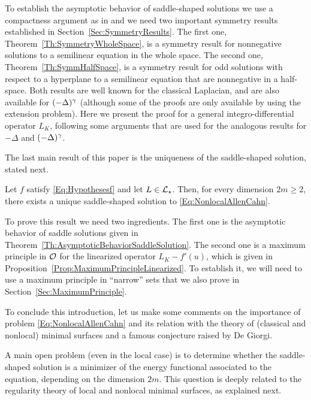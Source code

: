 To establish the asymptotic behavior of saddle-shaped solutions we use a compactness argument as in \cite{CabreTerraII, Cinti-Saddle, Cinti-Saddle2} and we need two important symmetry results established in Section~\ref{Sec:SymmetryResults}. The first one, Theorem~\ref{Th:SymmetryWholeSpace}, is a symmetry result for nonnegative solutions to a semilinear equation in the whole space. The second one, Theorem~\ref{Th:SymmHalfSpace}, is a symmetry result for odd solutions with respect to a hyperplane to a semilinear equation that are nonnegative in a half-space. Both results are well known for the classical Laplacian, and are also available for $(-\Delta)^\gamma$ (although some of the proofs are only available by using the extension problem). Here we present the proof for a general integro-differential operator $L_K$, following some arguments that are used for the analogous results for $-\Delta$ and $(-\Delta)^\gamma$.

The last main result of this paper is the uniqueness of the saddle-shaped solution, stated next.

\begin{theorem}
	\label{Th:Uniqueness}
	Let $f$ satisfy \eqref{Eq:Hypothesesf} and let $L\in \mathcal{L}_\star$. Then, for every dimension $2m \geq 2$, there exists a unique saddle-shaped solution to \eqref{Eq:NonlocalAllenCahn}.
\end{theorem}

To prove this result we need two ingredients. The first one is the asymptotic behavior of saddle solutions given in Theorem~\ref{Th:AsymptoticBehaviorSaddleSolution}. The second one is a maximum principle in $\mathcal{O}$ for the linearized operator $L_K - f'(u)$, which is given in Proposition~\ref{Prop:MaximumPrincipleLinearized}. To establish it, we will need to use a maximum principle in ``narrow'' sets that we also prove in Section~\ref{Sec:MaximumPrinciple}.

To conclude this introduction, let us make some comments on the importance of problem \eqref{Eq:NonlocalAllenCahn} and its relation with the theory of (classical and nonlocal) minimal surfaces and  a famous conjecture raised by De Giorgi.

A main open problem (even in the local case) is to determine whether the saddle-shaped solution is a minimizer of the energy functional associated to the equation, depending on the dimension $2m$. This question is deeply related to the regularity theory of local and nonlocal minimal surfaces, as explained next.

